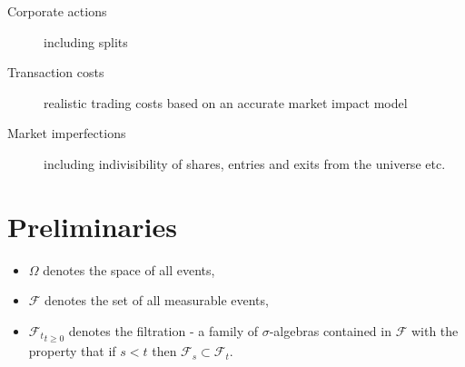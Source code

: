 \documentclass[british]{amsart}
\numberwithin{equation}{section}
\numberwithin{figure}{section}
\theoremstyle{plain}
\theoremstyle{definition}
\theoremstyle{plain}
\theoremstyle{plain}
\theoremstyle{plain}
\theoremstyle{remark}
\theoremstyle{plain}
\newcommand{\filtration}[1]{\mathcal{F_{#1}}}
\begin{document}
% 
% 
% 

\begin{description}
	\item [Corporate actions] including splits
	\item [Transaction costs] realistic trading costs based on an accurate 
		market impact model
	\item [Market imperfections] including indivisibility of shares, entries 
		and exits from the universe etc.
\end{description}

\section{Preliminaries}


\begin{itemize}
	\item $\Omega$ denotes the space of all events,
	\item $\mathcal{F}$ denotes the set of all measurable events,
	\item ${ \mathcal{F}_{t}} _{t\ge0}$ denotes the filtration
		- a family of $\sigma$-algebras contained in $\mathcal{F}$ with
		the property that if $s<t$ then $\mathcal{F}_{s}\subset\mathcal{F}_{t}$. 
\end{itemize}
\end{document}
